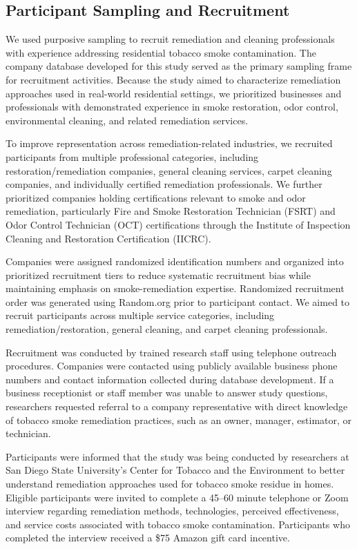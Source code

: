 \documentclass[stu]{apa7}
\begin{document}
\subsection{Participant Sampling and Recruitment}

We used purposive sampling to recruit remediation and cleaning professionals with experience addressing residential tobacco smoke contamination. The company database developed for this study served as the primary sampling frame for recruitment activities. Because the study aimed to characterize remediation approaches used in real-world residential settings, we prioritized businesses and professionals with demonstrated experience in smoke restoration, odor control, environmental cleaning, and related remediation services.

To improve representation across remediation-related industries, we recruited participants from multiple professional categories, including restoration/remediation companies, general cleaning services, carpet cleaning companies, and individually certified remediation professionals. We further prioritized companies holding certifications relevant to smoke and odor remediation, particularly Fire and Smoke Restoration Technician (FSRT) and Odor Control Technician (OCT) certifications through the Institute of Inspection Cleaning and Restoration Certification (IICRC).

Companies were assigned randomized identification numbers and organized into prioritized recruitment tiers to reduce systematic recruitment bias while maintaining emphasis on smoke-remediation expertise. Randomized recruitment order was generated using Random.org prior to participant contact. We aimed to recruit participants across multiple service categories, including remediation/restoration, general cleaning, and carpet cleaning professionals.

Recruitment was conducted by trained research staff using telephone outreach procedures. Companies were contacted using publicly available business phone numbers and contact information collected during database development. If a business receptionist or staff member was unable to answer study questions, researchers requested referral to a company representative with direct knowledge of tobacco smoke remediation practices, such as an owner, manager, estimator, or technician.

Participants were informed that the study was being conducted by researchers at San Diego State University's Center for Tobacco and the Environment to better understand remediation approaches used for tobacco smoke residue in homes. Eligible participants were invited to complete a 45--60 minute telephone or Zoom interview regarding remediation methods, technologies, perceived effectiveness, and service costs associated with tobacco smoke contamination. Participants who completed the interview received a \$75 Amazon gift card incentive.
\end{document}
